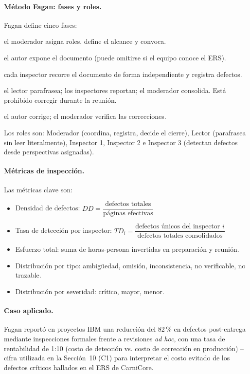 \documentclass[11pt,a4paper]{article}
\begin{document}
\paragraph{Método Fagan: fases y roles.} Fagan \cite{fagan1976} define cinco fases:
\begin{description}[nosep]
\item[F1. Planificación:] el moderador asigna roles, define el alcance y convoca.
\item[F2. Presentación:] el autor expone el documento (puede omitirse si el equipo conoce el ERS).
\item[F3. Preparación:] cada inspector recorre el documento de forma independiente y registra defectos.
\item[F4. Reunión de inspección:] el lector parafrasea; los inspectores reportan; el moderador consolida. Está prohibido corregir durante la reunión.
\item[F5. Corrección y seguimiento:] el autor corrige; el moderador verifica las correcciones.
\end{description}
Los roles son: Moderador (coordina, registra, decide el cierre), Lector (parafrasea
sin leer literalmente), Inspector 1, Inspector 2 e Inspector 3 (detectan defectos desde perspectivas
asignadas).

\paragraph{Métricas de inspección.} Las métricas clave \cite{pohl2010,wiegers2013} son:
\begin{itemize}[nosep]
\item Densidad de defectos: $DD = \dfrac{\text{defectos totales}}{\text{páginas efectivas}}$
\item Tasa de detección por inspector: $TD_i = \dfrac{\text{defectos únicos del inspector } i}{\text{defectos totales consolidados}}$
\item Esfuerzo total: suma de horas-persona invertidas en preparación y reunión.
\item Distribución por tipo: ambigüedad, omisión, inconsistencia, no verificable, no trazable.
\item Distribución por severidad: crítico, mayor, menor.
\end{itemize}

\paragraph{Caso aplicado.} Fagan \cite{fagan1976} reportó en proyectos IBM una reducción del 82\,\% en defectos post-entrega
mediante inspecciones formales frente a revisiones \textit{ad hoc}, con una tasa de rentabilidad
de 1:10 (costo de detección vs. costo de corrección en producción) -- cifra utilizada en la Sección~10 (C1) para interpretar el costo evitado de los defectos críticos hallados en el ERS de CarniCore.
\end{document}
